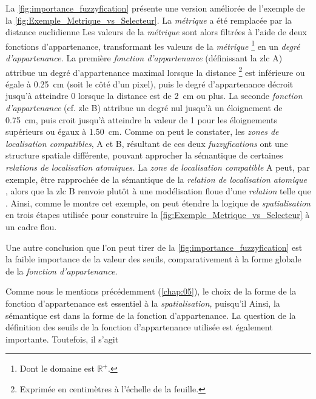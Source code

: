 La \autoref{fig:importance_fuzzyfication} présente une version
améliorée de l'exemple de la
\autoref{fig:Exemple_Metrique_vs_Selecteur}. La \emph{métrique} a été
remplacée par la distance euclidienne
%
Les valeurs de la \emph{métrique} sont alors filtrées à l'aide de deux
fonctions d'appartenance, transformant les valeurs de la
\emph{métrique} \footnote{Dont le domaine est \(\mathbb{R}^+\).} en un
\emph{degré d'appartenance.} La première \emph{fonction
  d'appartenance} (définissant la \ac{zlc}
\textcolor{RdBu-9-1}{\textsf{A}}) attribue un degré d'appartenance
maximal lorsque la distance \footnote{Exprimée en centimètres à
  l'échelle de la feuille.} est inférieure ou égale à
\SI{0,25}{\centi\meter} (soit le côté d'un pixel), puis le degré
d'appartenance décroit jusqu'à atteindre 0 lorsque la distance est de
\SI{2}{\centi\meter} ou plus. La seconde \emph{fonction
  d'appartenance} (cf. \ac{zlc} \textcolor{RdBu-9-9}{\textsf{B}})
attribue un degré nul jusqu'à un éloignement de
\SI{0,75}{\centi\meter}, puis croit jusqu'à atteindre la valeur de 1
pour les éloignements supérieurs ou égaux à
\SI{1,50}{\centi\meter}. Comme on peut le constater, les \emph{zones
  de localisation compatibles}, \textcolor{RdBu-9-1}{\textsf{A}} et
\textcolor{RdBu-9-9}{\textsf{B}}, résultant de ces deux
\emph{fuzzyfications} ont une structure spatiale différente, pouvant
approcher la sémantique de certaines \emph{relations de localisation
  atomiques.} La \emph{zone de localisation compatible}
\textcolor{RdBu-9-1}{\textsf{A}} peut, par exemple, être rapprochée de
la sémantique de la \emph{relation de localisation atomique}
, alors que la \ac{zlc}
\textcolor{RdBu-9-9}{\textsf{B}} renvoie plutôt à une modélisation
floue d'une \emph{relation} telle que .
%
Ainsi, comme le montre cet exemple, on peut étendre la logique de
\emph{spatialisation} en trois étapes utilisée pour construire la
\autoref{fig:Exemple_Metrique_vs_Selecteur} à un cadre flou.

Une autre conclusion que l'on peut tirer de la
\autoref{fig:importance_fuzzyfication} est la faible importance de la
valeur des seuils, comparativement à la forme globale de la
\emph{fonction d'appartenance.}



Comme nous le mentions précédemment (\autoref{chap:05}), le choix de
la forme de la fonction d'appartenance est essentiel à la
\emph{spatialisation,} puisqu'il
%
Ainsi, la sémantique est dans la forme de la fonction d'appartenance.
%
La question de la définition des seuils de la fonction d'appartenance
utilisée est également importante. Toutefois, il s'agit

